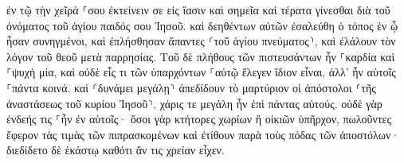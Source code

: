 \documentclass{openreader}
\begin{document}
ἐν τῷ τὴν χεῖρά ⸀σου ἐκτείνειν σε εἰς ἴασιν καὶ σημεῖα καὶ τέρατα γίνεσθαι διὰ τοῦ ὀνόματος τοῦ ἁγίου παιδός σου Ἰησοῦ. 
καὶ δεηθέντων αὐτῶν ἐσαλεύθη ὁ τόπος ἐν ᾧ ἦσαν συνηγμένοι, καὶ ἐπλήσθησαν ἅπαντες ⸂τοῦ ἁγίου πνεύματος⸃, καὶ ἐλάλουν τὸν λόγον τοῦ θεοῦ μετὰ παρρησίας. 
Τοῦ δὲ πλήθους τῶν πιστευσάντων ἦν ⸀καρδία καὶ ⸀ψυχὴ μία, καὶ οὐδὲ εἷς τι τῶν ὑπαρχόντων ⸀αὐτῷ ἔλεγεν ἴδιον εἶναι, ἀλλ’ ἦν αὐτοῖς ⸀πάντα κοινά. 
καὶ ⸂δυνάμει μεγάλῃ⸃ ἀπεδίδουν τὸ μαρτύριον οἱ ἀπόστολοι ⸂τῆς ἀναστάσεως τοῦ κυρίου Ἰησοῦ⸃, χάρις τε μεγάλη ἦν ἐπὶ πάντας αὐτούς. 
οὐδὲ γὰρ ἐνδεής τις ⸀ἦν ἐν αὐτοῖς· ὅσοι γὰρ κτήτορες χωρίων ἢ οἰκιῶν ὑπῆρχον, πωλοῦντες ἔφερον τὰς τιμὰς τῶν πιπρασκομένων 
καὶ ἐτίθουν παρὰ τοὺς πόδας τῶν ἀποστόλων· διεδίδετο δὲ ἑκάστῳ καθότι ἄν τις χρείαν εἶχεν. 
\end{document}
